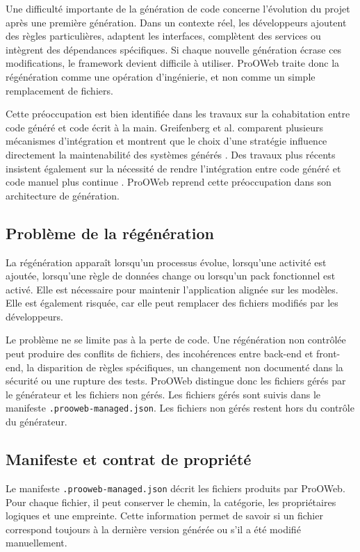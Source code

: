 Une difficulté importante de la génération de code concerne l'évolution du projet après une première génération. Dans un contexte réel, les développeurs ajoutent des règles particulières, adaptent les interfaces, complètent des services ou intègrent des dépendances spécifiques. Si chaque nouvelle génération écrase ces modifications, le framework devient difficile à utiliser. ProOWeb traite donc la régénération comme une opération d'ingénierie, et non comme un simple remplacement de fichiers.

Cette préoccupation est bien identifiée dans les travaux sur la cohabitation entre code généré et code écrit à la main. Greifenberg et al. comparent plusieurs mécanismes d'intégration et montrent que le choix d'une stratégie influence directement la maintenabilité des systèmes générés \cite{greifenberg2015}. Des travaux plus récents insistent également sur la nécessité de rendre l'intégration entre code généré et code manuel plus continue \cite{rahad2021,dragas2024}. ProOWeb reprend cette préoccupation dans son architecture de génération.

\subsection{Problème de la régénération}

La régénération apparaît lorsqu'un processus évolue, lorsqu'une activité est ajoutée, lorsqu'une règle de données change ou lorsqu'un pack fonctionnel est activé. Elle est nécessaire pour maintenir l'application alignée sur les modèles. Elle est également risquée, car elle peut remplacer des fichiers modifiés par les développeurs.

Le problème ne se limite pas à la perte de code. Une régénération non contrôlée peut produire des conflits de fichiers, des incohérences entre back-end et front-end, la disparition de règles spécifiques, un changement non documenté dans la sécurité ou une rupture des tests. ProOWeb distingue donc les fichiers gérés par le générateur et les fichiers non gérés. Les fichiers gérés sont suivis dans le manifeste \texttt{.prooweb-managed.json}. Les fichiers non gérés restent hors du contrôle du générateur.

\subsection{Manifeste et contrat de propriété}

Le manifeste \texttt{.prooweb-managed.json} décrit les fichiers produits par ProOWeb. Pour chaque fichier, il peut conserver le chemin, la catégorie, les propriétaires logiques et une empreinte. Cette information permet de savoir si un fichier correspond toujours à la dernière version générée ou s'il a été modifié manuellement.

